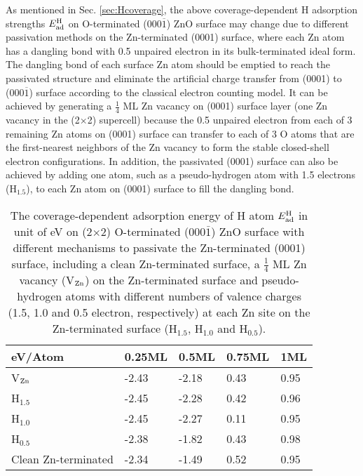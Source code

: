 
As mentioned in Sec. \ref{sec:Hcoverage}, the above coverage-dependent H adsorption strengths $E_{\textup{ad}}^{\textup{H}}$ on O-terminated (000$\overline{1}$) ZnO surface may change due to different passivation methods on the Zn-terminated (0001) surface, where each Zn atom has a dangling bond with 0.5 unpaired electron in its bulk-terminated ideal form. The dangling bond of each surface Zn atom should be emptied to reach the passivated structure and eliminate the artificial charge transfer from (0001) to (000$\overline{1}$) surface according to the classical electron counting model\cite{pashley1989electron}. It can be achieved by generating a  $\frac{1}{4}$ ML Zn vacancy on (0001) surface layer (one Zn vacancy in the (2$\times$2) supercell) because the 0.5 unpaired electron from each of 3 remaining Zn atoms on (0001) surface can transfer to each of 3 O atoms that are the first-nearest neighbors of the Zn vacancy to form the stable closed-shell electron configurations. In addition, the passivated (0001) surface can also be achieved by adding one atom, such as a pseudo-hydrogen atom with 1.5 electrons (H$_{1.5}$), to each Zn atom on (0001) surface to fill the dangling bond.

\begin{table}[!htbp]
\centering
\caption[Comparison of different passivation mechanisms for the coverage-dependent adsorption energy of H atom]{The coverage-dependent adsorption energy of H atom $E_{\textup{ad}}^{\textup{H}}$ in unit of eV on (2$\times$2) O-terminated (000$\bar{1}$) ZnO surface with different mechanisms to passivate the Zn-terminated (0001) surface, including a clean Zn-terminated surface, a $\frac{1}{4}$ ML Zn vacancy (V$_{\textup{Zn}}$) on the Zn-terminated surface and pseudo-hydrogen atoms with different numbers of valence charges (1.5, 1.0 and 0.5 electron, respectively) at each Zn site on the Zn-terminated surface (H$_{1.5}$, H$_{1.0}$ and H$_{0.5}$).}
\label{tab:pass}
\begin{tabular}{lllll}
\hline
eV/Atom       & 0.25ML & 0.5ML & 0.75ML & 1ML  \\ \hline
V$_{\textup{Zn}}$     & -2.43  & -2.18 & 0.43   & 0.95 \\
H$_{1.5}$         & -2.45  & -2.28 & 0.42   & 0.96 \\
H$_{1.0}$         & -2.45  & -2.27 & 0.11   & 0.95 \\
H$_{0.5}$         & -2.38  & -1.82 & 0.43   & 0.98 \\ 
Clean Zn-terminated & -2.34  & -1.49 & 0.52   & 0.95 \\
\hline
\end{tabular}
\end{table}

